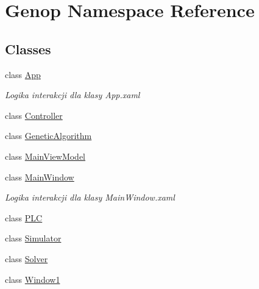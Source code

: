 \hypertarget{namespaceGenop}{}\section{Genop Namespace Reference}
\label{namespaceGenop}
\subsection*{Classes}
\begin{DoxyCompactItemize}
\item 
class \hyperlink{classGenop_1_1App}{App}
\begin{DoxyCompactList}\small\item\em Logika interakcji dla klasy App.\+xaml \end{DoxyCompactList}\item 
class \hyperlink{classGenop_1_1Controller}{Controller}
\item 
class \hyperlink{classGenop_1_1GeneticAlgorithm}{Genetic\+Algorithm}
\item 
class \hyperlink{classGenop_1_1MainViewModel}{Main\+View\+Model}
\item 
class \hyperlink{classGenop_1_1MainWindow}{Main\+Window}
\begin{DoxyCompactList}\small\item\em Logika interakcji dla klasy Main\+Window.\+xaml \end{DoxyCompactList}\item 
class \hyperlink{classGenop_1_1PLC}{P\+LC}
\item 
class \hyperlink{classGenop_1_1Simulator}{Simulator}
\item 
class \hyperlink{classGenop_1_1Solver}{Solver}
\item 
class \hyperlink{classGenop_1_1Window1}{Window1}
\end{DoxyCompactItemize}
